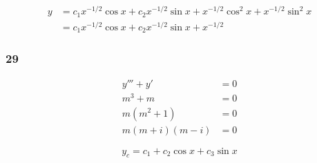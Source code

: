 \documentclass{article}
\begin{document}
\begin{align*}
  y & = c_1 x^{-1 / 2} \cos x + c_2 x^{-1 / 2} \sin x + x^{-1 / 2} \cos^2 x + x^{-1 / 2} \sin^2 x \\
    & = c_1 x^{-1 / 2} \cos x + c_2 x^{-1 / 2} \sin x + x^{-1 / 2}
\end{align*}

\subsubsection{29}

\begin{align*}
  y''' + y'         & = 0 \\
  m^3 + m           & = 0 \\
  m (m^2 + 1)       & = 0 \\
  m (m + i) (m - i) & = 0
\end{align*}

\[y_c = c_1 + c_2 \cos x + c_3 \sin x\]
\end{document}
